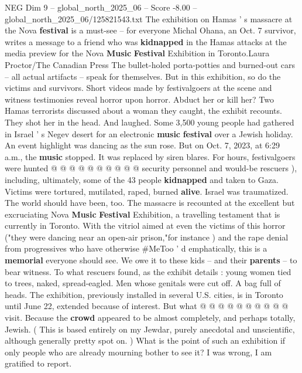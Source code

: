 \begin{textsample}{NEG Dim 9 – global\_north\_2025\_06 – Score -8.00 – global\_north\_2025\_06/125821543.txt}  \label{ex:f9_neg_094}
The exhibition on Hamas ' s massacre at the Nova \textbf{festival} is a must-see -- for everyone Michal Ohana, an Oct. 7 survivor, writes a message to a friend who was \textbf{kidnapped} in the Hamas attacks at the media preview for the Nova \textbf{Music} \textbf{Festival} Exhibition in Toronto.Laura Proctor/The Canadian Press The bullet-holed porta-potties and burned-out cars -- all actual artifacts -- speak for themselves.
But in this exhibition, so do the victims and survivors.
Short videos made by festivalgoers at the scene and witness testimonies reveal horror upon horror.
Abduct her or kill her?
Two Hamas terrorists discussed about a woman they caught, the exhibit recounts.
They shot her in the head.
And laughed.
Some 3,500 young people had gathered in Israel ' s Negev desert for an electronic \textbf{music} \textbf{festival} over a Jewish holiday.
An event highlight was dancing as the sun rose.
But on Oct. 7, 2023, at 6:29 a.m., the \textbf{music} stopped.
It was replaced by siren blares.
For hours, festivalgoers were hunted @ @ @ @ @ @ @ @ @ @ security personnel and would-be rescuers ), including, ultimately, some of the 43 people \textbf{kidnapped} and taken to Gaza.
Victims were tortured, mutilated, raped, burned \textbf{alive}.
Israel was traumatized.
The world should have been, too.
The massacre is recounted at the excellent but excruciating Nova \textbf{Music} \textbf{Festival} Exhibition, a travelling testament that is currently in Toronto.
With the vitriol aimed at even the victims of this horror ("they were dancing near an open-air prison,"for instance ) and the rape denial from progressives who have otherwise \#MeToo ' d emphatically, this is a \textbf{memorial} everyone should see.
We owe it to these kids -- and their \textbf{parents} -- to bear witness.
To what rescuers found, as the exhibit details : young women tied to trees, naked, spread-eagled.
Men whose genitals were cut off.
A bag full of heads.
The exhibition, previously installed in several U.S. cities, is in Toronto until June 22, extended because of interest.
But what @ @ @ @ @ @ @ @ @ @ visit.
Because the \textbf{crowd} appeared to be almost completely, and perhaps totally, Jewish. ( This is based entirely on my Jewdar, purely anecdotal and unscientific, although generally pretty spot on. ) What is the point of such an exhibition if only people who are already mourning bother to see it?
I was wrong, I am gratified to report.

\end{textsample}
